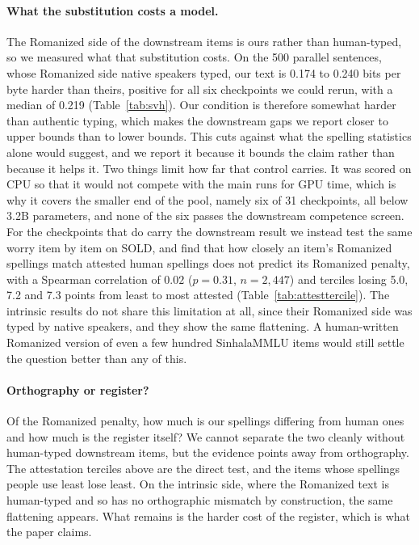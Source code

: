 \documentclass{article}
\begin{document}
\paragraph{What the substitution costs a model.} The Romanized side of the downstream
items is ours rather than human-typed, so we measured what that substitution costs.
On the 500 parallel sentences, whose Romanized side native speakers typed, our text
is 0.174 to 0.240 bits per byte harder than theirs, positive for all six checkpoints
we could rerun, with a median of 0.219 (Table~\ref{tab:svh}). Our condition is
therefore somewhat harder than authentic typing, which makes the downstream gaps we
report closer to upper bounds than to lower bounds. This cuts against what the
spelling statistics alone would suggest, and we report it because it bounds the claim
rather than because it helps it. Two things limit how far that control carries. It was
scored on CPU so that it would not compete with the main runs for GPU time, which is why
it covers the smaller end of the pool, namely six of 31 checkpoints, all below 3.2B parameters,
and none of the six passes the downstream competence screen. For the checkpoints that do carry the downstream
result we instead test the same worry item by item on SOLD, and find that how closely
an item's Romanized spellings match attested human spellings does not predict its
Romanized penalty, with a Spearman correlation of $0.02$ ($p = 0.31$, $n = 2{,}447$)
and terciles losing 5.0, 7.2 and 7.3 points from least to most attested
(Table~\ref{tab:attesttercile}). The intrinsic results do not share this limitation at
all, since their Romanized side was typed by native speakers, and they show the same
flattening. A human-written Romanized version of even a few hundred SinhalaMMLU items
would still settle the question better than any of this.

\paragraph{Orthography or register?} Of the Romanized penalty, how much is our spellings
differing from human ones and how much is the register itself? We cannot separate the two
cleanly without human-typed downstream items, but the evidence points away from
orthography. The attestation terciles above are the direct test, and the items whose
spellings people use least lose least. On the intrinsic side, where the Romanized text is
human-typed and so has no orthographic mismatch by construction, the same flattening
appears. What remains is the harder cost of the register, which is what the paper claims.
\end{document}
